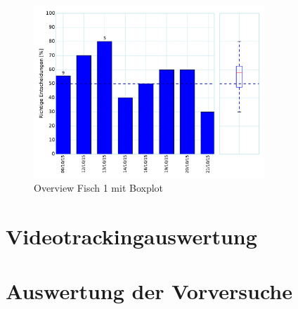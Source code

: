 \begin{figure}[ht]
\includegraphics[height=6.5cm]{Abbildungen/getauschte_Stimuli}
\caption{\label{fig:amplitude1_1}Overview Fisch 1 mit Boxplot}
\end{figure}





\section{Videotrackingauswertung}
\section{Auswertung der Vorversuche}